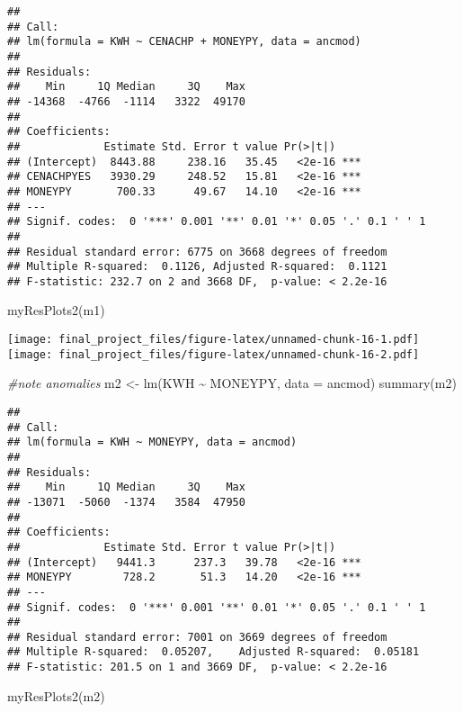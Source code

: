 \documentclass[
]{article}
\newenvironment{Shaded}{\begin{snugshade}}{\end{snugshade}}
\newcommand{\AttributeTok}[1]{\textcolor[rgb]{0.77,0.63,0.00}{#1}}
\newcommand{\CommentTok}[1]{\textcolor[rgb]{0.56,0.35,0.01}{\textit{#1}}}
\newcommand{\FunctionTok}[1]{\textcolor[rgb]{0.00,0.00,0.00}{#1}}
\newcommand{\NormalTok}[1]{#1}
\newcommand{\OtherTok}[1]{\textcolor[rgb]{0.56,0.35,0.01}{#1}}
\newcommand{\SpecialCharTok}[1]{\textcolor[rgb]{0.00,0.00,0.00}{#1}}
\begin{document}
\begin{verbatim}
## 
## Call:
## lm(formula = KWH ~ CENACHP + MONEYPY, data = ancmod)
## 
## Residuals:
##    Min     1Q Median     3Q    Max 
## -14368  -4766  -1114   3322  49170 
## 
## Coefficients:
##             Estimate Std. Error t value Pr(>|t|)    
## (Intercept)  8443.88     238.16   35.45   <2e-16 ***
## CENACHPYES   3930.29     248.52   15.81   <2e-16 ***
## MONEYPY       700.33      49.67   14.10   <2e-16 ***
## ---
## Signif. codes:  0 '***' 0.001 '**' 0.01 '*' 0.05 '.' 0.1 ' ' 1
## 
## Residual standard error: 6775 on 3668 degrees of freedom
## Multiple R-squared:  0.1126, Adjusted R-squared:  0.1121 
## F-statistic: 232.7 on 2 and 3668 DF,  p-value: < 2.2e-16
\end{verbatim}

\begin{Shaded}
\begin{Highlighting}[]
\FunctionTok{myResPlots2}\NormalTok{(m1)}
\end{Highlighting}
\end{Shaded}

\texttt{[image: final\_project\_files/figure-latex/unnamed-chunk-16-1.pdf]}
\texttt{[image: final\_project\_files/figure-latex/unnamed-chunk-16-2.pdf]}

\begin{Shaded}
\begin{Highlighting}[]
\CommentTok{\#note anomalies }
\NormalTok{m2 }\OtherTok{\textless{}{-}} \FunctionTok{lm}\NormalTok{(KWH }\SpecialCharTok{\textasciitilde{}}\NormalTok{ MONEYPY, }\AttributeTok{data =}\NormalTok{ ancmod)}
\FunctionTok{summary}\NormalTok{(m2)}
\end{Highlighting}
\end{Shaded}

\begin{verbatim}
## 
## Call:
## lm(formula = KWH ~ MONEYPY, data = ancmod)
## 
## Residuals:
##    Min     1Q Median     3Q    Max 
## -13071  -5060  -1374   3584  47950 
## 
## Coefficients:
##             Estimate Std. Error t value Pr(>|t|)    
## (Intercept)   9441.3      237.3   39.78   <2e-16 ***
## MONEYPY        728.2       51.3   14.20   <2e-16 ***
## ---
## Signif. codes:  0 '***' 0.001 '**' 0.01 '*' 0.05 '.' 0.1 ' ' 1
## 
## Residual standard error: 7001 on 3669 degrees of freedom
## Multiple R-squared:  0.05207,    Adjusted R-squared:  0.05181 
## F-statistic: 201.5 on 1 and 3669 DF,  p-value: < 2.2e-16
\end{verbatim}

\begin{Shaded}
\begin{Highlighting}[]
\FunctionTok{myResPlots2}\NormalTok{(m2)}
\end{Highlighting}
\end{Shaded}
\end{document}
